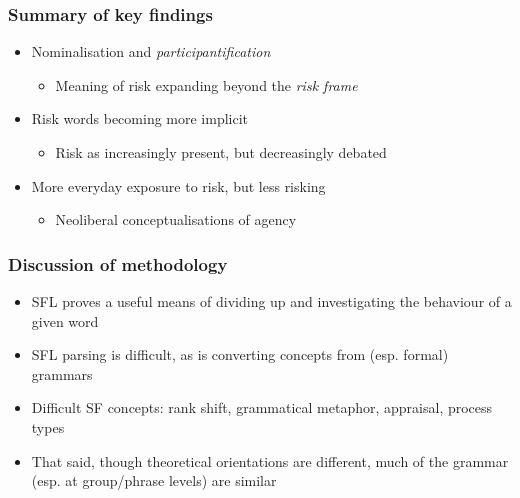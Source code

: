 \documentclass{beamer}       %
\begin{document}

\begin{frame}
    \frametitle{Summary of key findings}
    
    \begin{itemize}
    \item Nominalisation and \emph{participantification}
    \begin{itemize}
        \item Meaning of risk expanding beyond the \emph{risk frame}
    \end{itemize}
    \item Risk words becoming more implicit
    \begin{itemize}
        \item Risk as increasingly present, but decreasingly debated
    \end{itemize}
    \item More everyday exposure to risk, but less risking
    \begin{itemize}
        \item Neoliberal conceptualisations of agency
    \end{itemize}
    \end{itemize}
\end{frame}

\begin{frame}
    \frametitle{Discussion of methodology}
    
    \begin{itemize}
    \item SFL proves a useful means of dividing up and investigating the behaviour of a given word
    \item SFL parsing is difficult, as is converting concepts from (esp. formal) grammars
    \item Difficult SF concepts: rank shift, grammatical metaphor, appraisal, process types \cite{yan_automatic_2014,costetchi_semantic_2013,heyvaert_nominalization_2003}
    \item That said, though theoretical orientations are different, much of the grammar (esp. at group\slash phrase levels) are similar

    \end{itemize}
\end{frame}
\end{document}
